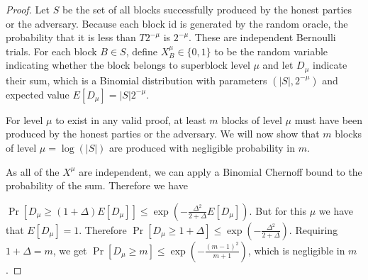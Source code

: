 \begin{proof}

    Let $S$ be the set of all blocks successfully produced by the honest
    parties or the adversary. Because each block id is generated by the random
    oracle, the probability that it is less than $T 2^{-\mu}$ is
    $2^{-\mu}$. These are independent Bernoulli trials. For each block
    $B \in S$, define $X^{\mu}_B \in \{0, 1\}$ to be the random variable
    indicating whether the block belongs to superblock level $\mu$ and let
    $D_\mu$ indicate their sum, which is a Binomial distribution with
    parameters $(|S|, 2^{-\mu})$ and expected value $E[D_{\mu}] =
    |S| 2^{-\mu}$.

    For level $\mu$ to exist in any valid proof, at least $m$ blocks of level
    $\mu$ must have been produced by the honest parties or the adversary. We
    will now show that $m$ blocks of level $\mu = \log(|S|)$ are produced with
    negligible probability in $m$.

    As all of the $X^{\mu}$ are independent, we can apply a Binomial Chernoff
    bound to the probability of the sum. Therefore we have

    $\Pr[D_\mu \geq (1 + \Delta)E[D_\mu]] \leq \exp(-\frac{\Delta^2}{2 +
    \Delta}E[D_\mu])$. But for this $\mu$ we have that $E[D_\mu] = 1$.
    Therefore $\Pr[D_\mu \geq 1 + \Delta] \leq \exp(-\frac{\Delta^2}{2 +
    \Delta})$. Requiring $1 + \Delta = m$, we get $\Pr[D_\mu \geq m] \leq
    \exp(-\frac{(m - 1)^2}{m + 1})$, which is negligible in $m$.
    \Qed
\end{proof}
